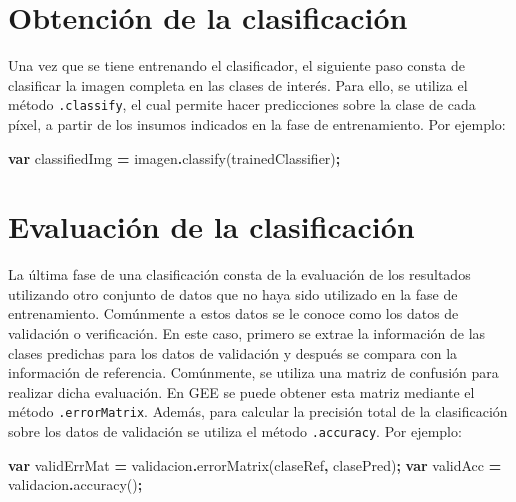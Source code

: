 \documentclass[
  12pt,
  letterpaper,
  twoside]{book}
\newenvironment{Shaded}{\begin{snugshade}}{\end{snugshade}}
\newcommand{\FunctionTok}[1]{\textcolor[rgb]{0.00,0.00,0.00}{#1}}
\newcommand{\KeywordTok}[1]{\textcolor[rgb]{0.13,0.29,0.53}{\textbf{#1}}}
\newcommand{\NormalTok}[1]{#1}
\newcommand{\OperatorTok}[1]{\textcolor[rgb]{0.81,0.36,0.00}{\textbf{#1}}}
\newcommand{\StringTok}[1]{\textcolor[rgb]{0.31,0.60,0.02}{#1}}
\begin{document}
\hypertarget{obtenciuxf3n-de-la-clasificaciuxf3n}{%
\section{Obtención de la clasificación}\label{obtenciuxf3n-de-la-clasificaciuxf3n}}

Una vez que se tiene entrenando el clasificador, el siguiente paso consta de clasificar la imagen completa en las clases de interés. Para ello, se utiliza el método \texttt{.classify}, el cual permite hacer predicciones sobre la clase de cada píxel, a partir de los insumos indicados en la fase de entrenamiento. Por ejemplo:

\begin{Shaded}
\begin{Highlighting}[]
\KeywordTok{var}\NormalTok{ classifiedImg }\OperatorTok{=}\NormalTok{ imagen}\OperatorTok{.}\FunctionTok{classify}\NormalTok{(trainedClassifier)}\OperatorTok{;}
\end{Highlighting}
\end{Shaded}

\hypertarget{evaluaciuxf3n-de-la-clasificaciuxf3n}{%
\section{Evaluación de la clasificación}\label{evaluaciuxf3n-de-la-clasificaciuxf3n}}

La última fase de una clasificación consta de la evaluación de los resultados utilizando otro conjunto de datos que no haya sido utilizado en la fase de entrenamiento. Comúnmente a estos datos se le conoce como los datos de validación o verificación. En este caso, primero se extrae la información de las clases predichas para los datos de validación y después se compara con la información de referencia. Comúnmente, se utiliza una matriz de confusión para realizar dicha evaluación. En GEE se puede obtener esta matriz mediante el método \texttt{.errorMatrix}. Además, para calcular la precisión total de la clasificación sobre los datos de validación se utiliza el método \texttt{.accuracy}. Por ejemplo:

\begin{Shaded}
\begin{Highlighting}[]
\KeywordTok{var}\NormalTok{ validErrMat }\OperatorTok{=}\NormalTok{ validacion}\OperatorTok{.}\FunctionTok{errorMatrix}\NormalTok{(}\StringTok{\textquotesingle{}claseRef\textquotesingle{}}\OperatorTok{,} \StringTok{\textquotesingle{}clasePred\textquotesingle{}}\NormalTok{)}\OperatorTok{;}
\KeywordTok{var}\NormalTok{ validAcc }\OperatorTok{=}\NormalTok{ validacion}\OperatorTok{.}\FunctionTok{accuracy}\NormalTok{()}\OperatorTok{;}
\end{Highlighting}
\end{Shaded}
\end{document}
